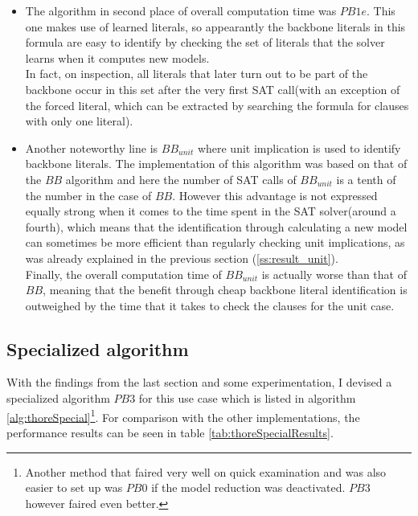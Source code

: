 \begin{itemize}
\item The algorithm in second place of overall computation time was $PB1e$. This one makes use of learned literals, so appearantly the backbone literals in this formula are easy to identify by checking the set of literals that the solver learns when it computes new models.\\
In fact, on inspection, all literals that later turn out to be part of the backbone occur in this set after the very first SAT call(with an exception of the forced literal, which can be extracted by searching the formula for clauses with only one literal).
\item Another noteworthy line is $BB_{unit}$ where unit implication is used to identify backbone literals. The implementation of this algorithm was based on that of the $BB$ algorithm and here the number of SAT calls of $BB_{unit}$ is a tenth of the number in the case of $BB$. However this advantage is not expressed equally strong when it comes to the time spent in the SAT solver(around a fourth), which means that the identification through calculating a new model can sometimes be more efficient than regularly checking unit implications, as was already explained in the previous section (\ref{ss:result_unit}).\\
Finally, the overall computation time of $BB_{unit}$ is actually worse than that of $BB$, meaning that the benefit through cheap backbone literal identification is outweighed by the time that it takes to check the clauses for the unit case. 
\end{itemize}

\subsection{Specialized algorithm}

With the findings from the last section and some experimentation, I devised a specialized algorithm $PB3$ for this use case which is listed in algorithm \ref{alg:thoreSpecial}\footnote{
	Another method that faired very well on quick examination and was also easier to set up was $PB0$ if the model reduction was deactivated. $PB3$ however faired even better.
}. For comparison with the other implementations, the performance results can be seen in table \ref{tab:thoreSpecialResults}.


